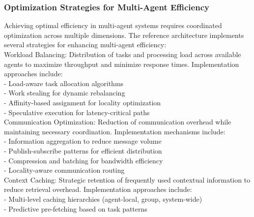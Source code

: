 \subsubsection{Optimization Strategies for Multi-Agent Efficiency}
Achieving optimal efficiency in multi-agent systems requires coordinated optimization across multiple dimensions. The reference architecture implements several strategies for enhancing multi-agent efficiency:\\ \newline
Workload Balancing: Distribution of tasks and processing load across available agents to maximize throughput and minimize response times. Implementation approaches include:\\ \newline
- Load-aware task allocation algorithms\\ \newline
- Work stealing for dynamic rebalancing\\ \newline
- Affinity-based assignment for locality optimization\\ \newline
- Speculative execution for latency-critical paths\\ \newline
Communication Optimization: Reduction of communication overhead while maintaining necessary coordination. Implementation mechanisms include:\\ \newline
- Information aggregation to reduce message volume\\ \newline
- Publish-subscribe patterns for efficient distribution\\ \newline
- Compression and batching for bandwidth efficiency\\ \newline
- Locality-aware communication routing\\ \newline
Context Caching: Strategic retention of frequently used contextual information to reduce retrieval overhead. Implementation approaches include:\\ \newline
- Multi-level caching hierarchies (agent-local, group, system-wide)\\ \newline
- Predictive pre-fetching based on task patterns\\ \newline
